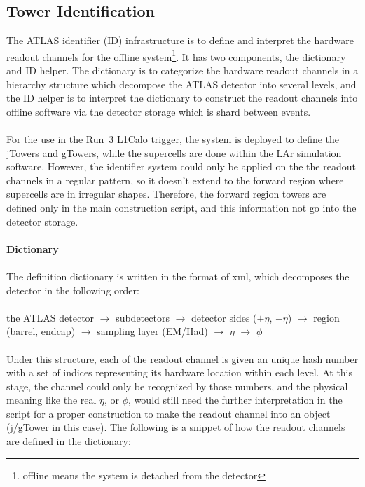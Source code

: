 \subsection{Tower Identification}
The ATLAS identifier (ID) infrastructure\cite{Schaffer:684167,Arnault:2003pa} is to define and interpret the hardware readout channels for the offline system\footnote{offline means the system is detached from the detector}. It has two components, the dictionary and ID helper. The dictionary is to categorize the hardware readout channels in a hierarchy structure which decompose the ATLAS detector into several levels, and the ID helper is to interpret the dictionary to construct the readout channels into offline software via the detector storage which is shard between events. 
\\
\\For the use in the Run~3 L1Calo trigger, the system is deployed to define the jTowers and gTowers, while the supercells are done within the LAr simulation software. However, the identifier system could only be applied on the the readout channels in a regular pattern, so it doesn't extend to the forward region where supercells are in irregular shapes. Therefore, the forward region towers are defined only in the main construction script, and this information not go into the detector storage. 
\\
\\{\bf Dictionary}
\\
\\The definition dictionary is written in the format of xml, which decomposes the detector in the following order:
\\
\\the ATLAS detector $\to$ subdetectors $\to$ detector sides ($+\eta$, $-\eta$) $\to$ region (barrel, endcap) $\to$ sampling layer (EM/Had) $\to$ $\eta$ $\to$ $\phi$
\\
\\Under this structure, each of the readout channel is given an unique hash number with a set of indices representing its hardware location within each level. At this stage, the channel could only be recognized by those numbers, and the physical meaning like the real $\eta$, or $\phi$, would still need the further interpretation in the script for a proper construction to make the readout channel into an object (j/gTower in this case). The following is a snippet of how the readout channels are defined in the dictionary:
\\
